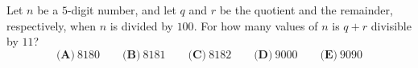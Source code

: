 Let $n$ be a $5$-digit number, and let $q$ and $r$ be the quotient and the remainder, respectively, when $n$ is divided by $100$. For how many values of $n$ is $q+r$ divisible by $11$?
\[\textbf{(A)}\ 8180\qquad\textbf{(B)}\ 8181\qquad\textbf{(C)}\ 8182\qquad\textbf{(D)}\ 9000\qquad\textbf{(E)}\ 9090\]
